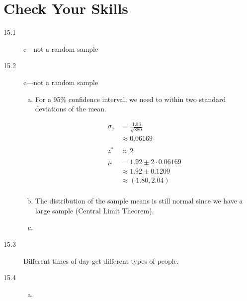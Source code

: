 \documentclass[landscape]{exam}
\begin{document}
  \section{Check Your Skills}
  \begin{description}
    \item[15.1] c---not a random sample

    \item[15.2] c---not a random sample
      \begin{enumerate}[(a)]
        \item 
          For a 95\% confidence interval, we need to within two standard
          deviations of the mean.

          \begin{align*}
            \sigma_{\bar{x}} & = \frac{1.83}{\sqrt{880}} \\
                             & \approx 0.06169 \\
            \\
            z^* &\approx 2 \\
            \\
            \mu & = 1.92 \pm 2 \cdot 0.06169 \\
                & \approx 1.92 \pm 0.1209 \\
                & \approx (1.80, 2.04) \\
          \end{align*}

        \item The distribution of the sample means is still normal since we have
          a large sample (Central Limit Theorem).

        \item 
      \end{enumerate}

    \item[15.3] Different times of day get different types of people.

    \item[15.4] 
      \begin{enumerate}[(a)]
        \item


\end{enumerate}
\end{description}
\end{document}
